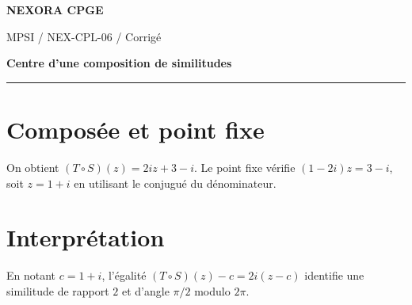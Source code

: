 \documentclass[11pt,a4paper]{article}
\begin{document}
{\small\bfseries\color{nexorablue} NEXORA CPGE}\par
{\small MPSI / NEX-CPL-06 / Corrigé}\par
{\LARGE\bfseries Centre d’une composition de similitudes}\par
\vspace{0.25em}\hrule\vspace{0.6em}

\section*{Composée et point fixe}
On obtient $(T\circ S)(z)=2iz+3-i$. Le point fixe vérifie $(1-2i)z=3-i$, soit $z=1+i$ en utilisant le conjugué du dénominateur.

\section*{Interprétation}
En notant $c=1+i$, l’égalité $(T\circ S)(z)-c=2i(z-c)$ identifie une similitude de rapport $2$ et d’angle $\pi/2$ modulo $2\pi$.
\end{document}
